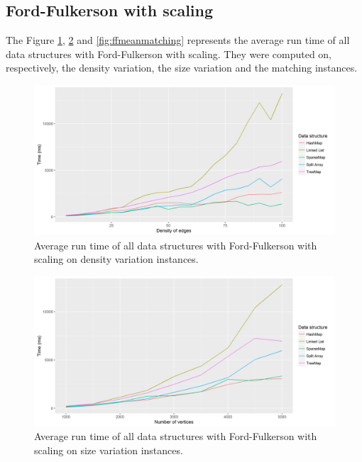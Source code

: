 \subsection{Ford-Fulkerson with scaling}
The Figure \ref{fig:ffmeandensity}, \ref{fig:ffmeansize} and \ref{fig:ffmeanmatching} represents the average run time of all data structures with Ford-Fulkerson with scaling. They were computed on, respectively, the density variation, the size variation and the matching instances.
\begin{figure}[H]
\begin{center}
\includegraphics[scale=0.5]{images/results/ffmeandensity.png}
\caption{Average run time of all data structures with Ford-Fulkerson with scaling on density variation instances.}
\label{fig:ffmeandensity}
\end{center}
\end{figure}
\begin{figure}[H]
\begin{center}
\includegraphics[scale=0.5]{images/results/ffmeansize.png}
\caption{Average run time of all data structures with Ford-Fulkerson with scaling on size variation instances.}
\label{fig:ffmeansize}
\end{center}
\end{figure}
